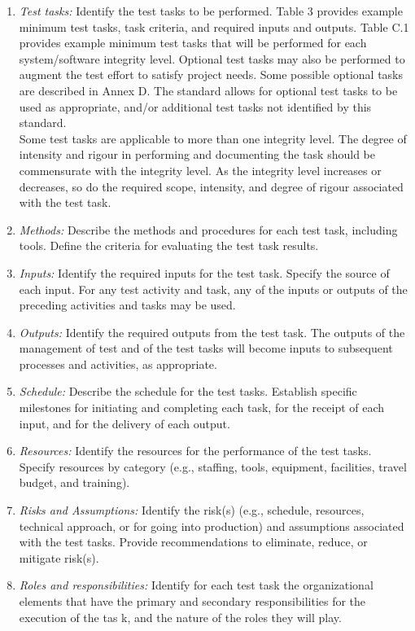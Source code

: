 \documentclass{scrreprt}
\begin{document}
	\begin{enumerate}
		\item \emph{Test tasks:} Identify the test tasks to be performed. Table 3 provides example minimum test
		tasks, task criteria, and required inputs and outputs. Table C.1 provides example minimum
		test tasks that will be performed for each system/software integrity level.
		Optional test tasks may also be performed to augment the test effort to satisfy project needs.
		Some possible optional tasks are described in Annex D. The standard allows for optional
		test tasks to be used as appropriate, and/or additional test tasks not identified by this
		standard.\\
		Some test tasks are applicable to more than one integrity level. The degree of intensity and
		rigour in performing and documenting the task should be commensurate with the integrity
		level. As the integrity level increases or decreases, so do the required scope, intensity, and
		degree of rigour associated with the test task.
		\item \emph{Methods:} Describe the methods and procedures for each test task, including tools. Define
		the criteria for evaluating the test task results.
		\item \emph{Inputs:} Identify the required inputs for the test task. Specify the source of each input. For
		any test activity and task, any of the inputs or outputs of the preceding activities and tasks
		may be used.
		\item \emph{Outputs:} Identify the required outputs from the test task. The outputs of the management of
		test and of the test tasks will become inputs to subsequent processes and activities, as
		appropriate.
		\item \emph{Schedule:} Describe the schedule for the test tasks. Establish specific milestones for
		initiating and completing each task, for the receipt of each input, and for the delivery of
		each output.
		\item \emph{Resources:} Identify the resources for the performance of the test tasks. Specify resources by
		category (e.g., staffing, tools, equipment, facilities, travel budget, and training).
		\item \emph{Risks and Assumptions:} Identify the risk(s) (e.g., schedule, resources, technical approach, or
		for going into production) and assumptions associated with the test tasks. Provide
		recommendations to eliminate, reduce, or mitigate risk(s).
		\item \emph{Roles and responsibilities:} Identify for each test task the organizational elements that have
		the primary and secondary responsibilities for the execution of the tas
		k, and the nature of the roles they will play.
	\end{enumerate}
\end{document}
